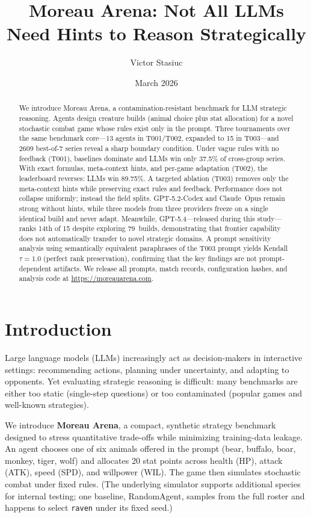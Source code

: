 \documentclass[11pt]{article}
\title{Moreau Arena: Not All LLMs Need Hints to Reason Strategically}
\author[1]{Victor Stasiuc}
\affil[1]{Independent Researcher\\
\texttt{stvitek@gmail.com}\\
ORCID: \href{https://orcid.org/0009-0003-2064-0486}{0009-0003-2064-0486}}
\date{March 2026}
\newcommand{\tOne}{T001}
\newcommand{\tTwo}{T002}
\newcommand{\tThree}{T003}
\begin{document}
\maketitle

\vspace{-0.7em}
\begin{abstract}
We introduce Moreau Arena, a contamination-resistant benchmark for LLM strategic reasoning.
Agents design creature builds (animal choice plus stat allocation) for a novel stochastic combat game whose rules exist only in the prompt.
Three tournaments over the same benchmark core---13 agents in \tOne/\tTwo, expanded to 15 in \tThree---and 2609 best-of-7 series reveal a sharp boundary condition.
Under vague rules with no feedback (\tOne), baselines dominate and LLMs win only 37.5\% of cross-group series.
With exact formulas, meta-context hints, and per-game adaptation (\tTwo), the leaderboard reverses: LLMs win 89.75\%.
A targeted ablation (\tThree) removes only the meta-context hints while preserving exact rules and feedback.
Performance does not collapse uniformly; instead the field splits.
GPT-5.2-Codex and Claude~Opus remain strong without hints, while three models from three providers freeze on a single identical build and never adapt.
Meanwhile, GPT-5.4---released during this study---ranks 14th of 15 despite exploring 79~builds, demonstrating that frontier capability does not automatically transfer to novel strategic domains.
A prompt sensitivity analysis using semantically equivalent paraphrases of the \tThree{} prompt yields Kendall $\tau=1.0$ (perfect rank preservation), confirming that the key findings are not prompt-dependent artifacts.
We release all prompts, match records, configuration hashes, and analysis code at \url{https://moreauarena.com}.
\end{abstract}

\section{Introduction}

Large language models (LLMs) increasingly act as decision-makers in interactive settings: recommending actions, planning under uncertainty, and adapting to opponents.
Yet evaluating strategic reasoning is difficult: many benchmarks are either too static (single-step questions) or too contaminated (popular games and well-known strategies).

We introduce \textbf{Moreau Arena}, a compact, synthetic strategy benchmark designed to stress quantitative trade-offs while minimizing training-data leakage.
An agent chooses one of six animals offered in the prompt (bear, buffalo, boar, monkey, tiger, wolf) and allocates 20 stat points across health (HP), attack (ATK), speed (SPD), and willpower (WIL).
The game then simulates stochastic combat under fixed rules.
(The underlying simulator supports additional species for internal testing; one baseline, RandomAgent, samples from the full roster and happens to select \texttt{raven} under its fixed seed.)
\end{document}
